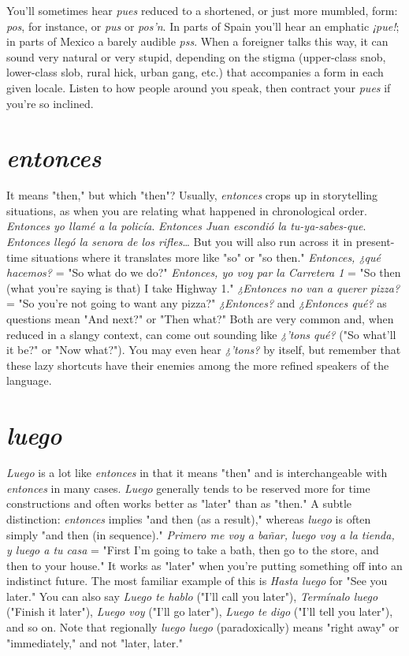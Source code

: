 \documentclass[14pt,a4paper,oneside]{memoir}
\begin{document}
You'll sometimes hear \emph{pues} reduced to a shortened, or just
more mumbled, form: \emph{pos}, for instance, or \emph{pus} or \emph{pos'n}. In parts of
Spain you'll hear an emphatic \emph{¡pue!}; in parts of Mexico a barely audible \emph{pss}. When a foreigner talks this way, it can sound very natural
or very stupid, depending on the stigma (upper-class snob, lower-class
slob, rural hick, urban gang, etc.) that accompanies a form in each
given locale. Listen to how people around you speak, then contract
your \emph{pues} if you're so inclined.

\section{\emph{entonces}}

It means "then," but which "then"? Usually, \emph{entonces} crops
up in storytelling situations, as when you are relating what happened
in chronological order. \emph{Entonces yo llamé a la policía}. \emph{Entonces Juan
escondió la tu-ya-sabes-que}. \emph{Entonces llegó la senora de los rifles}\ldots{}
But you will also run across it in present-time situations where it
translates more like "so" or "so then." \emph{Entonces, ¿qué hacemos?} = "So
what do we do?" \emph{Entonces, yo voy par la Carretera 1} = "So then (what
you're saying is that) I take Highway 1." \emph{¿Entonces no van a querer
pizza?} = "So you're not going to want any pizza?" \emph{¿Entonces?} and \emph{¿Entonces qué?} as questions mean "And next?" or "Then what?" Both are
very common and, when reduced in a slangy context, can come out
sounding like \emph{¿'tons qué?} ("So what'll it be?" or "Now what?").
You
may even hear \emph{¿'tons?} by itself, but remember that these lazy shortcuts
have their enemies among the more refined speakers of the language.

\section{\emph{luego}}

\emph{Luego} is a lot like \emph{entonces} in that it means "then" and is interchangeable with \emph{entonces} in many cases. \emph{Luego} generally tends
to be reserved more for time constructions and often works better as
"later" than as "then." A subtle distinction: \emph{entonces} implies "and
then (as a result)," whereas \emph{luego} is often simply "and then (in sequence)." \emph{Primero me voy a bañar, luego voy a la tienda, y luego a tu
casa} = "First I'm going to take a bath, then go to the store, and then
to your house." It works as "later" when you're putting something off
into an indistinct future. The most familiar example of this is \emph{Hasta
luego} for "See you later." You can also say \emph{Luego te hablo} ("I'll call
you later"), \emph{Termínalo luego} ("Finish it later"), \emph{Luego voy} ("I'll go
later"), \emph{Luego te digo} ("I'll tell you later"), and so on. Note that regionally \emph{luego luego} (paradoxically) means "right away" or "immediately,"
and not "later, later."
\end{document}
